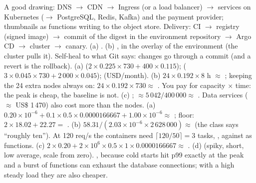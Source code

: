  A good drawing: DNS $\to$ CDN $\to$ Ingress (or a load balancer) $\to$ services on Kubernetes ($\to$ PostgreSQL, Redis, Kafka) and the payment provider; thumbnails as functions writing to the object store. Delivery: CI $\to$ registry (signed image) $\to$ commit of the digest in the environment repository $\to$ Argo CD $\to$ cluster $\to$ canary. (a) . (b) , in the overlay of the environment (the cluster pulls it). Self-heal  to what Git says: changes go through a commit (and a revert is the rollback).
 (a)  ($2 \times 0.225 \times 730 + 400 \times 0.115$);  ($3 \times 0.045 \times 730 + 2\,000 \times 0.045$);  (USD/month). (b) $24 \times 0.192 \times 8$ h $\approx$ ; keeping the 24 extra nodes always on: $24 \times 0.192 \times 730 \approx$ . You pay for capacity $\times$ time: the peak is cheap, the baseline is not. (c) ; $\approx 5\,042 / 400\,000 \approx$ . Data services ($\approx$ US\$ 1\,470) also cost more than the nodes.
 (a) $0.20 \times 10^{-6} + 0.1 \times 0.5 \times 0.0000166667 + 1.00 \times 10^{-6} \approx$ ; floor: $2 \times 18.02 + 22.27 =$ . (b) $58.31 / (2.03 \times 10^{-6} \times 2\,628\,000) \approx$  (the class says ``roughly ten''). At 120 req/s the containers need $\lceil 120/50 \rceil = 3$ tasks, , against  as functions. (c) $2 \times 0.20 + 2 \times 10^6 \times 0.5 \times 1 \times 0.0000166667 \approx$ . (d)  (spiky, short, low average, scale from zero). , because cold starts hit p99 exactly at the peak and a burst of functions can exhaust the database connections; with a high steady load they are also cheaper.
